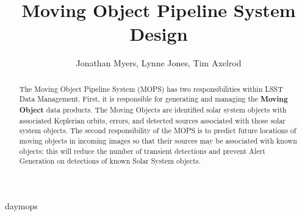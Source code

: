 \documentclass[12pt,preprint]{aastex}
\begin{document}
\title{Moving Object Pipeline System Design}

\author{Jonathan Myers, Lynne Jones, Tim Axelrod}

\begin{abstract}

The Moving Object Pipeline System (MOPS) has two responsibilities
within LSST Data Management.  First, it is responsible for generating
and managing the \textbf{Moving Object} data products.  The Moving
Objects are identified solar system objects with associated Keplerian
orbits, errors, and detected sources associated with those solar
system objects.  The second responsibility of the MOPS is to predict
future locations of moving objects in incoming images so that their
sources may be associated with known objects; this will reduce the
number of transient detections and prevent Alert Generation on
detections of known Solar System objects.  

\end{abstract}

\tableofcontents




 {daymops}












\end{document}
